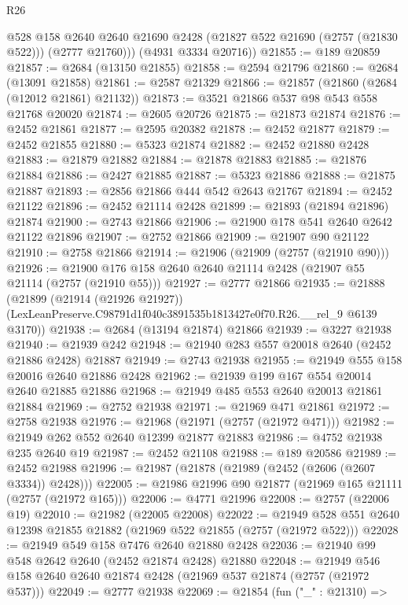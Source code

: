 \begin{lexlean}{R26}
\begin{coremodule}
          @528
          @158
          @2640
          @2640
          @21690
          @2428
          (@21827 @522 @21690 (@2757 (@21830 @522)))
          (@2777 @21760)))
      (@4931 @3334 @20716))
@21855 := @189 @20859
@21857 := @2684 (@13150 @21855)
@21858 := @2594 @21796
@21860 := @2684 (@13091 @21858)
@21861 := @2587 @21329
@21866 := @21857 (@21860 (@2684 (@12012 @21861) @21132))
@21873 := @3521 @21866 @537 @98 @543 @558 @21768 @20020
@21874 := @2605 @20726
@21875 := @21873 @21874
@21876 := @2452 @21861
@21877 := @2595 @20382
@21878 := @2452 @21877
@21879 := @2452 @21855
@21880 := @5323 @21874
@21882 := @2452 @21880 @2428
@21883 := @21879 @21882
@21884 := @21878 @21883
@21885 := @21876 @21884
@21886 := @2427 @21885
@21887 := @5323 @21886
@21888 := @21875 @21887
@21893 := @2856 @21866 @444 @542 @2643 @21767
@21894 := @2452 @21122
@21896 := @2452 @21114 @2428
@21899 := @21893 (@21894 @21896) @21874
@21900 := @2743 @21866
@21906 := @21900 @178 @541 @2640 @2642 @21122 @21896
@21907 := @2752 @21866
@21909 := @21907 @90 @21122
@21910 := @2758 @21866
@21914 := @21906 (@21909 (@2757 (@21910 @90)))
@21926 := @21900 @176 @158 @2640 @2640 @21114 @2428 (@21907 @55 @21114 (@2757 (@21910 @55)))
@21927 := @2777 @21866
@21935 := @21888
    (@21899
      (@21914 (@21926 @21927))
      (LexLeanPreserve.C98791d1f040c3891535b1813427e0f70.R26.__rel_9 @6139 @3170))
@21938 := @2684 (@13194 @21874) @21866
@21939 := @3227 @21938
@21940 := @21939 @242
@21948 := @21940 @283 @557 @20018 @2640 (@2452 @21886 @2428) @21887
@21949 := @2743 @21938
@21955 := @21949 @555 @158 @20016 @2640 @21886 @2428
@21962 := @21939 @199 @167 @554 @20014 @2640 @21885 @21886
@21968 := @21949 @485 @553 @2640 @20013 @21861 @21884
@21969 := @2752 @21938
@21971 := @21969 @471 @21861
@21972 := @2758 @21938
@21976 := @21968 (@21971 (@2757 (@21972 @471)))
@21982 := @21949 @262 @552 @2640 @12399 @21877 @21883
@21986 := @4752 @21938 @235 @2640 @19
@21987 := @2452 @21108
@21988 := @189 @20586
@21989 := @2452 @21988
@21996 := @21987 (@21878 (@21989 (@2452 (@2606 (@2607 @3334)) @2428)))
@22005 := @21986 @21996 @90 @21877 (@21969 @165 @21111 (@2757 (@21972 @165)))
@22006 := @4771 @21996
@22008 := @2757 (@22006 @19)
@22010 := @21982 (@22005 @22008)
@22022 := @21949 @528 @551 @2640 @12398 @21855 @21882 (@21969 @522 @21855 (@2757 (@21972 @522)))
@22028 := @21949 @549 @158 @7476 @2640 @21880 @2428
@22036 := @21940 @99 @548 @2642 @2640 (@2452 @21874 @2428) @21880
@22048 := @21949 @546 @158 @2640 @2640 @21874 @2428 (@21969 @537 @21874 (@2757 (@21972 @537)))
@22049 := @2777 @21938
@22069 := @21854
    (fun ("_" : @21310) =>

\end{coremodule}
\end{lexlean}
